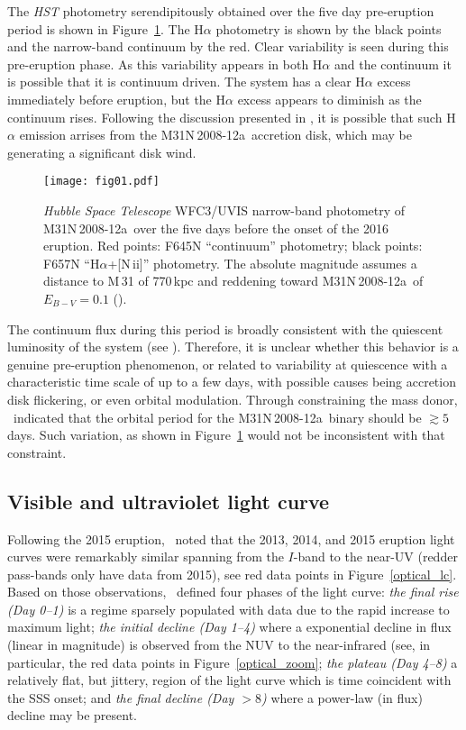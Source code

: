 \documentclass[twocolumn,tighten]{aastex6}
\def\novak{{M31N\,2008-12a}}
\newcommand{\othreek}{\citetalias{2016ApJ...833..149D}}
\newcommand{\hstspec}{\citetalias{2017ApJ...847...35D}}
\newcommand{\hstphot}{\citetalias{2017ApJ...849...96D}}
\begin{document}
The {\it HST} photometry serendipitously obtained over the five day pre-eruption period is shown in Figure~\ref{hst_pre}.  The H$\alpha$ photometry is shown by the black points and the narrow-band continuum by the red.  Clear variability is seen during this pre-eruption phase.  As this variability appears in both H$\alpha$ and the continuum it is possible that it is continuum driven.  The system has a clear H$\alpha$ excess immediately before eruption, but the H$\alpha$ excess appears to diminish as the continuum rises.  Following the discussion presented in \hstphot, it is possible that such H$\alpha$ emission arrises from the \novak\ accretion disk, which may be generating a significant disk wind.

\begin{figure}
\texttt{[image: fig01.pdf]}
\caption{{\it Hubble Space Telescope} WFC3/UVIS narrow-band photometry of \novak\ over the five days before the onset of the 2016 eruption.  Red points: F645N ``continuum'' photometry; black points: F657N ``H$\alpha$+[N\,{\sc ii}]'' photometry.  The absolute magnitude assumes a distance to M\,31 of 770\,kpc \citep{1990ApJ...365..186F} and reddening toward \novak\ of $E_{B-V}=0.1$ (\hstspec). \label{hst_pre}}
\end{figure}	

The continuum flux during this period is broadly consistent with the quiescent luminosity of the system (see \hstphot).  Therefore, it is unclear whether this behavior is a genuine pre-eruption phenomenon, or related to variability at quiescence with a characteristic time scale of up to a few days, with possible causes being accretion disk flickering, or even orbital modulation.  Through constraining the mass donor, \hstphot\ indicated that the orbital period for the \novak\ binary should be $\gtrsim5$\,days.  Such variation, as shown in Figure~\ref{hst_pre} would not be inconsistent with that constraint.

\subsection{Visible and ultraviolet light curve}
\label{sec:vis_lc_vis}

Following the 2015 eruption, \othreek\ noted that the 2013, 2014, and 2015 eruption light curves were remarkably similar spanning from the $I$-band to the near-UV (redder pass-bands only have data from 2015), see red data points in Figure~\ref{optical_lc}.  Based on those observations, \othreek\ defined four phases of the light curve: {\it the final rise (Day 0--1)} is a regime sparsely populated with data due to the rapid increase to maximum light; {\it the initial decline (Day 1--4)} where a exponential decline in flux (linear in magnitude) is observed from the NUV to the near-infrared (see, in particular, the red data points in Figure~\ref{optical_zoom}; {\it the plateau (Day 4--8)} a relatively flat, but jittery, region of the light curve which is time coincident with the SSS onset; and {\it the final decline (Day $>8$)} where a power-law (in flux) decline may be present.
\end{document}
